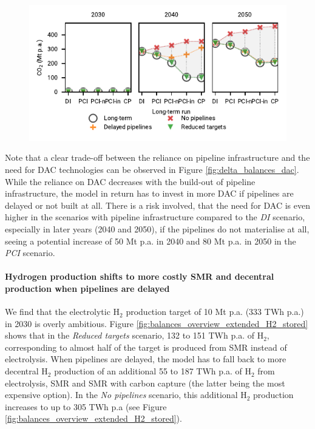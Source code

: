 \documentclass[pdflatex,sn-nature]{sn-jnl}%
\theoremstyle{thmstyleone}%
\theoremstyle{thmstyletwo}%
\theoremstyle{thmstylethree}%
\begin{document}
\begin{figure}[htbp]
  \centering
  \includegraphics{figures/delta_balances_DAC}
\end{figure}

Note that a clear trade-off between the reliance on pipeline infrastructure and the need for DAC technologies can be observed in Figure \ref{fig:delta_balances_dac}. While the reliance on DAC decreases with the build-out of pipeline infrastructure, the model in return has to invest in more DAC if pipelines are delayed or not built at all. There is a risk involved, that the need for DAC is even higher in the scenarios with pipeline infrastructure compared to the \textit{DI} scenario, especially in later years (2040 and 2050), if the pipelines do not materialise at all, seeing a potential increase of 50 Mt p.a. in 2040 and 80 Mt p.a. in 2050 in the \textit{PCI} scenario.

\paragraph{Hydrogen production shifts to more costly SMR and decentral production when pipelines are delayed} 
We find that the electrolytic H$_2$ production target of 10 Mt p.a. (333 TWh p.a.) in 2030 is overly ambitious. Figure \ref{fig:balances_overview_extended_H2_stored} shows that in the \textit{Reduced targets} scenario, 132 to 151 TWh p.a. of H$_2$, corresponding to almost half of the target is produced from SMR instead of electrolysis. When pipelines are delayed, the model has to fall back to more decentral H$_2$ production of an additional 55 to 187 TWh p.a. of H$_2$ from electrolysis, SMR and SMR with carbon capture (the latter being the most expensive option). In the \textit{No pipelines} scenario, this additional H$_2$ production increases to up to 305 TWh p.a (see Figure \ref{fig:balances_overview_extended_H2_stored}).
\end{document}
